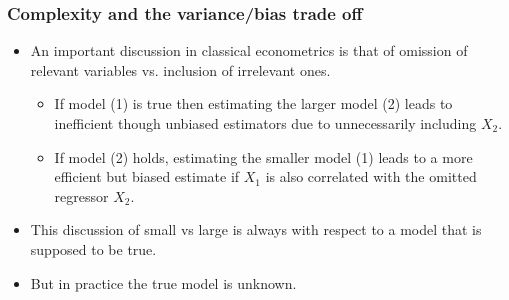 \documentclass[
  shownotes,
  xcolor={svgnames},
  hyperref={colorlinks,citecolor=DarkBlue,linkcolor=DarkRed,urlcolor=DarkBlue}
  , aspectratio=169]{beamer}
\begin{document}
\begin{frame}
\frametitle{Complexity and the variance/bias trade off}

\begin{itemize}
  \item An important discussion in classical econometrics is that of omission of relevant variables vs. inclusion of irrelevant ones. 
  \medskip
  \begin{itemize}
    \item If model (1) is true then estimating the larger model (2) leads to inefficient though unbiased estimators due to unnecessarily including $X_2$. 
    \medskip
    \item If model (2) holds, estimating the smaller model (1) leads to a more efficient but biased estimate if $X_1$ is also correlated with the omitted regressor $X_2$. 
  \end{itemize}
  \medskip
  \item This discussion of small vs large is always with respect to a model that is supposed to be true.
  \medskip
\item  But in practice the true model is unknown. 

\end{itemize}


\end{frame}
\end{document}
